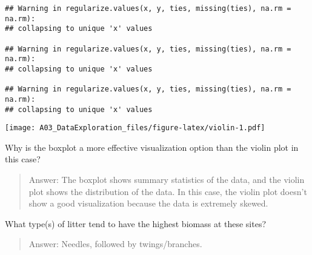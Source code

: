 \documentclass[
]{article}
\begin{document}
\begin{verbatim}
## Warning in regularize.values(x, y, ties, missing(ties), na.rm = na.rm):
## collapsing to unique 'x' values

## Warning in regularize.values(x, y, ties, missing(ties), na.rm = na.rm):
## collapsing to unique 'x' values

## Warning in regularize.values(x, y, ties, missing(ties), na.rm = na.rm):
## collapsing to unique 'x' values
\end{verbatim}

\texttt{[image: A03\_DataExploration\_files/figure-latex/violin-1.pdf]}

Why is the boxplot a more effective visualization option than the violin
plot in this case?

\begin{quote}
Answer: The boxplot shows summary statistics of the data, and the violin
plot shows the distribution of the data. In this case, the violin plot
doesn't show a good visualization because the data is extremely skewed.
\end{quote}

What type(s) of litter tend to have the highest biomass at these sites?

\begin{quote}
Answer: Needles, followed by twings/branches.
\end{quote}
\end{document}
